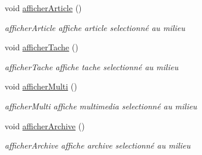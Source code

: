 \begin{DoxyCompactItemize}
void \hyperlink{class_fenetre_principale_a78e23e66e42390fff9936f121f2b47b4}{afficher\+Article} ()
\begin{DoxyCompactList}\small\item\em afficher\+Article affiche article selectionné au milieu \end{DoxyCompactList}\item 
\mbox{\label{class_fenetre_principale_a9295ee1fd8501a8dcc39f3bea03885fc}} 
void \hyperlink{class_fenetre_principale_a9295ee1fd8501a8dcc39f3bea03885fc}{afficher\+Tache} ()
\begin{DoxyCompactList}\small\item\em afficher\+Tache affiche tache selectionné au milieu \end{DoxyCompactList}\item 
\mbox{\label{class_fenetre_principale_a1ee3cca5ac799105f4a30b4cbcb811ed}} 
void \hyperlink{class_fenetre_principale_a1ee3cca5ac799105f4a30b4cbcb811ed}{afficher\+Multi} ()
\begin{DoxyCompactList}\small\item\em afficher\+Multi affiche multimedia selectionné au milieu \end{DoxyCompactList}\item 
\mbox{\label{class_fenetre_principale_a63c50d1b25d15bd175baa8d7b357a10b}} 
void \hyperlink{class_fenetre_principale_a63c50d1b25d15bd175baa8d7b357a10b}{afficher\+Archive} ()
\begin{DoxyCompactList}\small\item\em afficher\+Archive affiche archive selectionné au milieu \end{DoxyCompactList}\end{DoxyCompactItemize}
